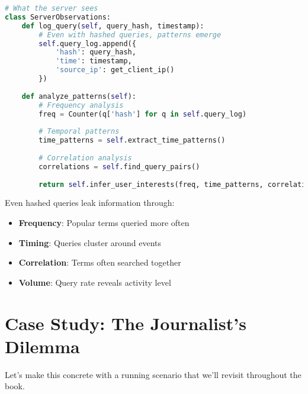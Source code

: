 \begin{lstlisting}[language=Python]
# What the server sees
class ServerObservations:
    def log_query(self, query_hash, timestamp):
        # Even with hashed queries, patterns emerge
        self.query_log.append({
            'hash': query_hash,
            'time': timestamp,
            'source_ip': get_client_ip()
        })
    
    def analyze_patterns(self):
        # Frequency analysis
        freq = Counter(q['hash'] for q in self.query_log)
        
        # Temporal patterns  
        time_patterns = self.extract_time_patterns()
        
        # Correlation analysis
        correlations = self.find_query_pairs()
        
        return self.infer_user_interests(freq, time_patterns, correlations)
\end{lstlisting}

Even hashed queries leak information through:
\begin{itemize}
\item \textbf{Frequency}: Popular terms queried more often
\item \textbf{Timing}: Queries cluster around events
\item \textbf{Correlation}: Terms often searched together
\item \textbf{Volume}: Query rate reveals activity level
\end{itemize}

\section{Case Study: The Journalist's Dilemma}

Let's make this concrete with a running scenario that we'll revisit throughout the book.

